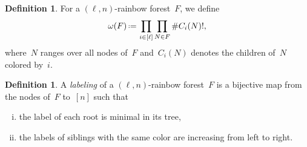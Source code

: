 \documentclass{amsart}
\newcommand{\darkblue}{\color{darkblue}} %
\theoremstyle{definition}
\newtheorem{definition}[theorem]{Definition}
\newcommand{\eqdef}{\mbox{\,\raisebox{0.2ex}{\scriptsize\ensuremath{\mathrm:}}\ensuremath{=}\,}} %
\newcommand{\card}[1]{\##1} %
\newcommand{\defn}[1]{\textsl{\darkblue #1}} %
\newcommand{\OEIS}[1]{\cite[{\rm \href{http://oeis.org/#1}{\texttt{#1}}}]{OEIS}}
\begin{document}
\begin{table}
	\centerline{}
	\caption{The Fuss-Catalan numbers~$F_{\ell,m} = \frac{1}{(\ell-1)m+1} \binom{\ell m}{m}$ for~$\ell,m \in [9]$. See \OEIS{A062993}.}
\end{table}

\begin{definition}
For a $(\ell,n)$-rainbow forest~$F$, we define
\[
\omega(F) \eqdef \prod_{i \in [\ell]} \prod_{N \in F} \card{C_i(N)}! ,
\]
where~$N$ ranges over all nodes of~$F$ and~$C_i(N)$ denotes the children of~$N$ colored by~$i$.
\end{definition}

\begin{definition}
\label{def:labelingRainbowForest}
A \defn{labeling} of a $(\ell,n)$-rainbow forest~$F$ is a bijective map from the nodes of~$F$ to~$[n]$ such that
\begin{enumerate}[(i)]
\item the label of each root is minimal in its tree,
\item the labels of siblings with the same color are increasing from left to right.
\end{enumerate}
\end{definition}
\end{document}
